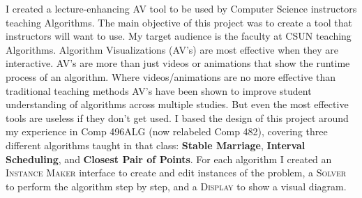 \hspace{-0.26in}
I created a lecture-enhancing AV tool 
to be used by Computer Science instructors teaching Algorithms.
The main objective of this project was 
to create a tool that instructors will want to use. 
My target audience is the faculty at CSUN teaching Algorithms. 
\newline\newline
Algorithm Visualizations (AV's) are most effective when they are interactive. 
AV's are more than just videos or animations that show the runtime process of an algorithm. Where videos/animations are no more effective than traditional teaching methods 
AV's have been shown to improve student understanding of algorithms across multiple studies. 
But even the most effective tools are useless if they don't get used. 
\newline\newline
I based the design of this project around my experience 
in Comp 496ALG (now relabeled Comp 482),
covering three different algorithms taught in that class: \textbf{Stable Marriage}, \textbf{Interval
Scheduling}, and \textbf{Closest Pair of Points}. 
For each algorithm I created 
an \textsc{Instance Maker} interface to create and edit instances of the problem, 
a \textsc{Solver} to perform the algorithm step by step,
and a \textsc{Display} to show a visual diagram.
